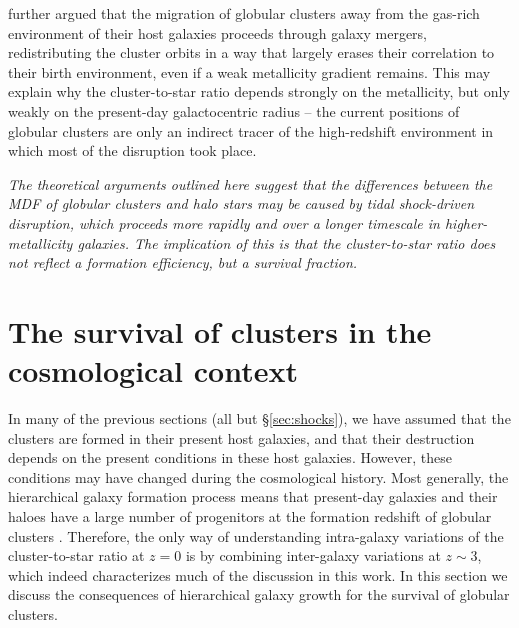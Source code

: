 \documentclass{aa}
\begin{document}
\citet{kruijssen15b} further argued that the migration of globular clusters away from the gas-rich environment of their host galaxies proceeds through galaxy mergers, redistributing the cluster orbits in a way that largely erases their correlation to their birth environment, even if a weak metallicity gradient remains. This may explain why the cluster-to-star ratio depends strongly on the metallicity, but only weakly on the present-day galactocentric radius -- the current positions of globular clusters are only an indirect tracer of the high-redshift environment in which most of the disruption took place.

{\it The theoretical arguments outlined here suggest that the differences between the MDF of globular clusters and halo stars may be caused by tidal shock-driven disruption, which proceeds more rapidly and over a longer timescale in higher-metallicity galaxies. The implication of this is that the cluster-to-star ratio does not reflect a formation efficiency, but a survival fraction.}



\section{The survival of clusters in the cosmological context}
\label{sec:cosmology}

In many of the previous sections (all but \S\ref{sec:shocks}), we have assumed that the clusters are formed in their present host galaxies, and that their destruction depends on the present conditions in these host galaxies. However, these conditions may have changed during the cosmological history. 
Most generally, the hierarchical galaxy formation process means that present-day galaxies and their haloes have a large number of progenitors at the formation redshift of globular clusters \citep[e.g.][]{delucia07}. Therefore, the only way of understanding intra-galaxy variations of the cluster-to-star ratio at $z=0$ is by combining inter-galaxy variations at $z\sim3$, which indeed characterizes much of the discussion in this work. In this section we discuss the consequences of hierarchical galaxy growth for the survival of globular clusters.
\end{document}
